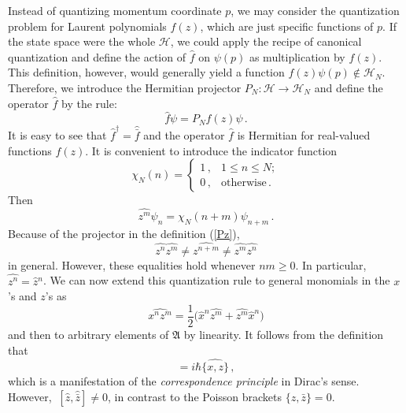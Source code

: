 \documentclass[12pt,a4paper]{article}
\numberwithin{equation}{section}
\theoremstyle{theorem}
\theoremstyle{remark}
\newcommand{\hh}{\mathcal{H}}
\newcommand{\hn}{\mathcal{H}_N}
\newcommand{\fa}{\mathfrak{A}}
\begin{document}
Instead of quantizing momentum coordinate $p$, we may consider the quantization problem for Laurent polynomials $f(z)$, which are just specific functions of $p$.  If the state space were the whole $\hh$, we could apply the recipe of canonical quantization and define the action of $\hat f$ on $\psi(p)$ as multiplication by $f(z)$. This definition, however, would generally yield a function $f(z)\psi(p)\notin \hn$. Therefore, we introduce the Hermitian projector $P_N: \hh\rightarrow \hn$ and define the operator $\hat f$ by the rule:
\begin{equation}\label{Pz}
    \hat{f}\psi=P_Nf(z)\psi\,.
\end{equation}
It is easy to see that 
     $\hat f^\dagger= \hat{\bar f}$ and the operator $\hat f$ is Hermitian for real-valued functions $f(z)$. It is convenient to introduce the indicator function 
     \begin{equation}
         \chi_N(n)= \left\{\begin{array}{cc}
              1\,, & 1\leq n\leq N ; \\
               0\,,& \mbox{otherwise} \,.
          \end{array}\right.
      \end{equation}     
Then
\begin{equation}
    \widehat{z^m}\psi_n=\chi_N(n+m)\psi_{n+m}\,.
\end{equation}
Because of the projector in the definition (\ref{Pz}), 
\begin{equation}
    \widehat{z^n}\widehat{z^m}\neq \widehat{z^{n+m}}\neq \widehat{z^m}\widehat{z^n}
\end{equation}
in general. However, these equalities hold whenever $nm\geq 0$. In particular, 
$\widehat{z^n}=\hat{z}{}^n $.
We can now extend this quantization rule to general monomials in the $x$'s and $z$'s as
     \begin{equation}\label{quant}
         \widehat{x^n z^m}=\frac12\big(\hat{x}^n\widehat{z^m}+\widehat{z^m}\hat{x}^n\big)
         \end{equation}
         and then to arbitrary elements of $\fa$ by linearity. It follows from the definition that
         \begin{equation}
             [\hat x,\hat z]=i\hbar \widehat{\{x, z\}}\,,
         \end{equation}
         which is a manifestation of the {\it correspondence principle} in Dirac's sense. However, $~{[\hat{z},\hat{\bar z}]\neq 0 }$, in contrast to the Poisson brackets $\{z,\bar z \}=0$. 
\end{document}
